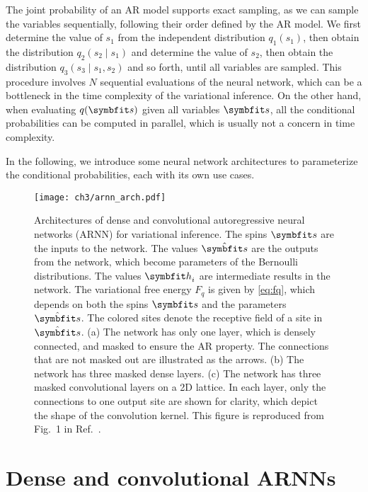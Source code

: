 The joint probability of an AR model supports exact sampling, as we can sample the variables sequentially, following their order defined by the AR model. We first determine the value of $s_1$ from the independent distribution $q_1(s_1)$, then obtain the distribution $q_2(s_2 \mid s_1)$ and determine the value of $s_2$, then obtain the distribution $q_3(s_3 \mid s_1, s_2)$ and so forth, until all variables are sampled. This procedure involves $N$ sequential evaluations of the neural network, which can be a bottleneck in the time complexity of the variational inference. On the other hand, when evaluating $q(\vs)$ given all variables $\vs$, all the conditional probabilities can be computed in parallel, which is usually not a concern in time complexity.

In the following, we introduce some neural network architectures to parameterize the conditional probabilities, each with its own use cases.

\begin{figure}[htb]
\centering
\texttt{[image: ch3/arnn\_arch.pdf]}
\caption[Architectures of autoregressive neural networks (ARNN)]{
Architectures of dense and convolutional autoregressive neural networks (ARNN) for variational inference.
The spins $\vs$ are the inputs to the network.
The values $\hat{\vs}$ are the outputs from the network, which become parameters of the Bernoulli distributions.
The values $\vh_i$ are intermediate results in the network.
The variational free energy $F_q$ is given by \cref{eq:fq}, which depends on both the spins $\vs$ and the parameters $\hat{\vs}$.
The colored sites denote the receptive field of a site in $\hat{\vs}$.
(a) The network has only one layer, which is densely connected, and masked to ensure the AR property. The connections that are not masked out are illustrated as the arrows.
(b) The network has three masked dense layers.
(c) The network has three masked convolutional layers on a 2D lattice. In each layer, only the connections to one output site are shown for clarity, which depict the shape of the convolution kernel.
This figure is reproduced from Fig.~1 in Ref.~\cite{wu2019solving}.
}
\label{fig:arnn-arch}
\end{figure}

\section{Dense and convolutional ARNNs}

